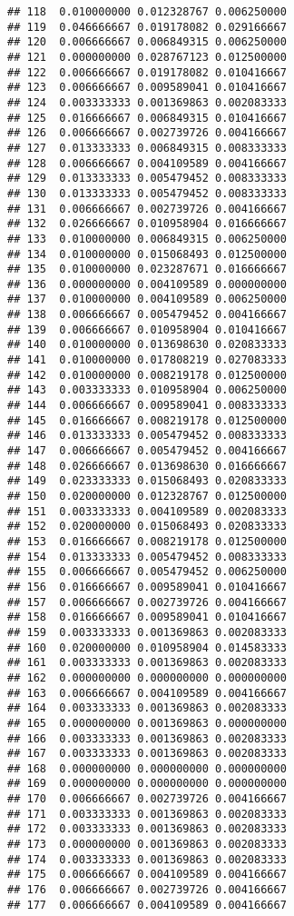 \documentclass[
]{article}
\begin{document}
\begin{verbatim}
## 118  0.010000000 0.012328767 0.006250000
## 119  0.046666667 0.019178082 0.029166667
## 120  0.006666667 0.006849315 0.006250000
## 121  0.000000000 0.028767123 0.012500000
## 122  0.006666667 0.019178082 0.010416667
## 123  0.006666667 0.009589041 0.010416667
## 124  0.003333333 0.001369863 0.002083333
## 125  0.016666667 0.006849315 0.010416667
## 126  0.006666667 0.002739726 0.004166667
## 127  0.013333333 0.006849315 0.008333333
## 128  0.006666667 0.004109589 0.004166667
## 129  0.013333333 0.005479452 0.008333333
## 130  0.013333333 0.005479452 0.008333333
## 131  0.006666667 0.002739726 0.004166667
## 132  0.026666667 0.010958904 0.016666667
## 133  0.010000000 0.006849315 0.006250000
## 134  0.010000000 0.015068493 0.012500000
## 135  0.010000000 0.023287671 0.016666667
## 136  0.000000000 0.004109589 0.000000000
## 137  0.010000000 0.004109589 0.006250000
## 138  0.006666667 0.005479452 0.004166667
## 139  0.006666667 0.010958904 0.010416667
## 140  0.010000000 0.013698630 0.020833333
## 141  0.010000000 0.017808219 0.027083333
## 142  0.010000000 0.008219178 0.012500000
## 143  0.003333333 0.010958904 0.006250000
## 144  0.006666667 0.009589041 0.008333333
## 145  0.016666667 0.008219178 0.012500000
## 146  0.013333333 0.005479452 0.008333333
## 147  0.006666667 0.005479452 0.004166667
## 148  0.026666667 0.013698630 0.016666667
## 149  0.023333333 0.015068493 0.020833333
## 150  0.020000000 0.012328767 0.012500000
## 151  0.003333333 0.004109589 0.002083333
## 152  0.020000000 0.015068493 0.020833333
## 153  0.016666667 0.008219178 0.012500000
## 154  0.013333333 0.005479452 0.008333333
## 155  0.006666667 0.005479452 0.006250000
## 156  0.016666667 0.009589041 0.010416667
## 157  0.006666667 0.002739726 0.004166667
## 158  0.016666667 0.009589041 0.010416667
## 159  0.003333333 0.001369863 0.002083333
## 160  0.020000000 0.010958904 0.014583333
## 161  0.003333333 0.001369863 0.002083333
## 162  0.000000000 0.000000000 0.000000000
## 163  0.006666667 0.004109589 0.004166667
## 164  0.003333333 0.001369863 0.002083333
## 165  0.000000000 0.001369863 0.000000000
## 166  0.003333333 0.001369863 0.002083333
## 167  0.003333333 0.001369863 0.002083333
## 168  0.000000000 0.000000000 0.000000000
## 169  0.000000000 0.000000000 0.000000000
## 170  0.006666667 0.002739726 0.004166667
## 171  0.003333333 0.001369863 0.002083333
## 172  0.003333333 0.001369863 0.002083333
## 173  0.000000000 0.001369863 0.002083333
## 174  0.003333333 0.001369863 0.002083333
## 175  0.006666667 0.004109589 0.004166667
## 176  0.006666667 0.002739726 0.004166667
## 177  0.006666667 0.004109589 0.004166667

\end{verbatim}
\end{document}
